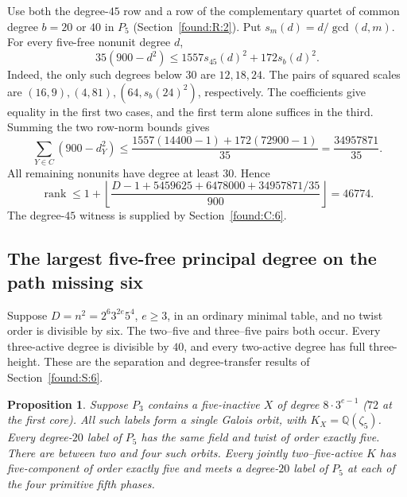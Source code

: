 \documentclass[11pt,a4paper]{article}
\numberwithin{equation}{section}
\newtheorem{proposition}[theorem]{Proposition}
\theoremstyle{remark}
\newcommand{\QQ}{\mathbb Q}
\begin{document}
Use both the degree-$45$ row and a row of the complementary quartet of common degree $b=20$ or $40$ in $P_5$ (Section~\ref{found:R:2}). Put
$s_m(d)=d/\gcd(d,m)$. For every five-free nonunit degree $d$,
\[
 35(900-d^2)\le1557s_{45}(d)^2+172s_b(d)^2.
\]
Indeed, the only such degrees below $30$ are $12,18,24$. The pairs of
squared scales are $(16,9),(4,81),(64,s_b(24)^2)$, respectively.
The coefficients give equality in the first two cases, and the first
term alone suffices in the third. Summing the two row-norm bounds gives
\[
 \sum_{Y\in C}(900-d_Y^2)\le
 \frac{1557(14400-1)+172(72900-1)}{35}
 =\frac{34957871}{35}.
\]
All remaining nonunits have degree at least $30$. Hence
\[
 \operatorname{rank}\le1+\left\lfloor
 \frac{D-1+5459625+6478000+34957871/35}{900}
 \right\rfloor=46774.
\]
The degree-$45$ witness is supplied by Section~\ref{found:C:6}.

\subsection{The largest five-free principal degree on the path missing six}\label{found:T:4}
Suppose $D=n^2=2^6 3^{2e}5^4$, $e\ge3$, in an ordinary minimal table,
and no twist order is divisible by six. The two--five and three--five
pairs both occur. Every three-active degree is divisible by $40$, and
every two-active degree has full three-height. These are the separation
and degree-transfer results of Section~\ref{found:S:6}.

\begin{proposition}\label{found:T:4.1}\label{found:T:key:prop:missing-six-upper}
Suppose $P_3$ contains a five-inactive $X$ of degree $8\cdot3^{e-1}$
($72$ at the first core). All such labels form a single Galois orbit,
with $K_X=\QQ(\zeta_5)$. Every degree-$20$ label of $P_5$ has the same
field and twist of order exactly five. There are between two and four
such orbits. Every jointly two--five-active $K$ has five-component of
order exactly five and meets a degree-$20$ label of $P_5$ at each of
the four primitive fifth phases.
\end{proposition}
\end{document}
